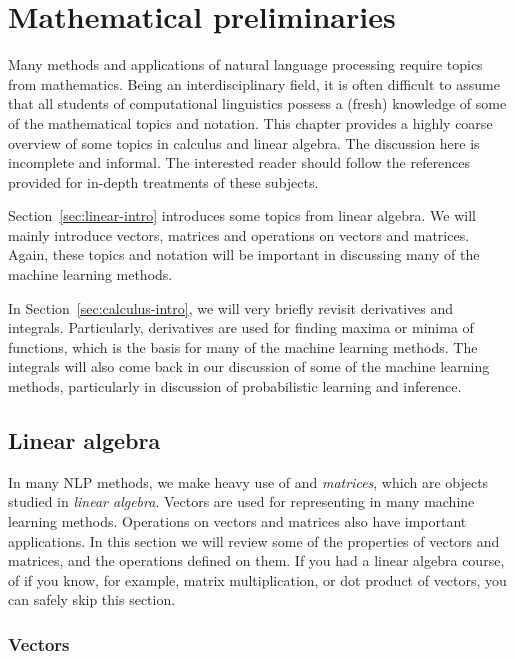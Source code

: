\chapter{\label{ch:math}Mathematical preliminaries}

Many methods and applications of natural language processing require
topics from mathematics.
Being an interdisciplinary field,
it is often difficult to assume
that all students of computational linguistics possess a (fresh) knowledge of
some of the mathematical topics and notation.
This chapter provides a highly coarse overview
of some topics in calculus and linear algebra.
The discussion here is incomplete and informal.
The interested reader should follow
the references provided for in-depth treatments of these subjects.

Section~\ref{sec:linear-intro} introduces some topics from linear algebra.
We will mainly introduce vectors, matrices and operations on vectors and matrices.
Again, these topics and notation will be important in discussing
many of the machine learning methods.


In Section~\ref{sec:calculus-intro},
we will very briefly revisit derivatives and integrals.
Particularly, derivatives are used for finding maxima or minima of functions,
which is the basis for many of the machine learning methods.
The integrals will also come back in our discussion of some of the machine learning methods,
particularly in discussion of probabilistic learning and inference.

\section{\label{sec:linear-intro}Linear algebra}

In many NLP methods,
we make heavy use of  and \emph{matrices},
which are objects studied in \emph{linear algebra}.
Vectors are used for representing  in many machine learning methods.
Operations on vectors and matrices also have important applications.
In this section we will review some of the properties of vectors and matrices,
and the operations defined on them.
If you had a linear algebra course,
of if you know, for example, matrix multiplication,
or dot product of vectors, you can safely skip this section.

\subsection{Vectors}

